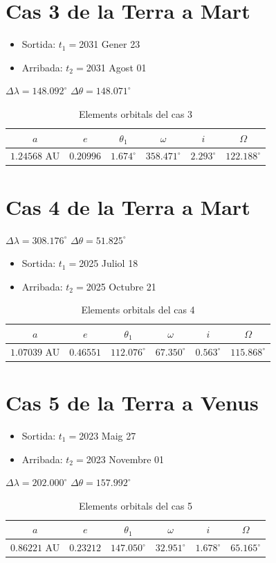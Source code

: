\section{Cas 3 de la Terra a Mart}
\begin{itemize}
	\item Sortida: $t_{1}=$2031 Gener 23
	\item Arribada: $t_{2}=$2031 Agost 01
\end{itemize}
$\Delta\lambda=148.092^{\circ}$
$\Delta\theta=148.071^{\circ}$
\begin{table}[h!]
	\centering
	\begin{tabular}{ |c|c|c|c|c|c|}
		\hline
		$a$ & $e$ & $\theta_{1}$ & $\omega$ & $i$ & $\Omega$ \\ \hline
		$1.24568$ AU  & $0.20996$ & $1.674^{\circ}$ & $358.471^{\circ}$ & $2.293^{\circ}$ & $122.188^{\circ}$ \\ \hline
	\end{tabular}
	\caption{Elements orbitals del cas 3}
\end{table}

\section{Cas 4 de la Terra a Mart}
$\Delta\lambda=308.176^{\circ}$
$\Delta\theta=51.825^{\circ}$
\begin{itemize}
	\item Sortida: $t_{1}=$2025 Juliol 18
	\item Arribada: $t_{2}=$2025 Octubre 21
\end{itemize}
\begin{table}[h!]
	\centering
	\begin{tabular}{ |c|c|c|c|c|c|}
		\hline
		$a$ & $e$ & $\theta_{1}$ & $\omega$ & $i$ & $\Omega$ \\ \hline
		$1.07039$ AU  & $0.46551$ & $112.076^{\circ}$ & $67.350^{\circ}$ & $0.563^{\circ}$ & $115.868^{\circ}$ \\ \hline
	\end{tabular}
	\caption{Elements orbitals del cas 4}
\end{table}

\section{Cas 5 de la Terra a Venus}
\begin{itemize}
	\item Sortida: $t_{1}=$2023 Maig 27
	\item Arribada: $t_{2}=$2023 Novembre 01
\end{itemize}
$\Delta\lambda=202.000^{\circ}$
$\Delta\theta=157.992^{\circ}$
\begin{table}[h!]
	\centering
	\begin{tabular}{ |c|c|c|c|c|c|}
		\hline
		$a$ & $e$ & $\theta_{1}$ & $\omega$ & $i$ & $\Omega$ \\ \hline
		$0.86221$ AU  & $0.23212$ & $147.050^{\circ}$ & $32.951^{\circ}$ & $1.678^{\circ}$ & $65.165^{\circ}$ \\ \hline
	\end{tabular}
	\caption{Elements orbitals del cas 5}
\end{table}

